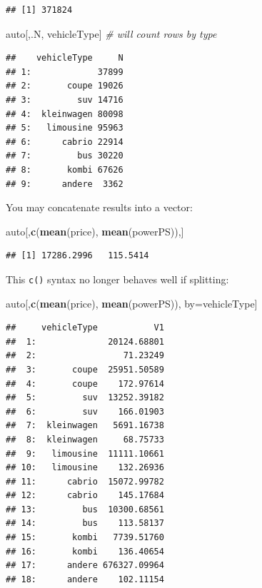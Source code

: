 \documentclass[]{book}
\newenvironment{Shaded}{\begin{snugshade}}{\end{snugshade}}
\newcommand{\CommentTok}[1]{\textcolor[rgb]{0.56,0.35,0.01}{\textit{#1}}}
\newcommand{\KeywordTok}[1]{\textcolor[rgb]{0.13,0.29,0.53}{\textbf{#1}}}
\newcommand{\NormalTok}[1]{#1}
\theoremstyle{definition}
\theoremstyle{definition}
\theoremstyle{definition}
\theoremstyle{remark}
\begin{document}
\begin{verbatim}
## [1] 371824
\end{verbatim}

\begin{Shaded}
\begin{Highlighting}[]
\NormalTok{auto[,.N, vehicleType] }\CommentTok{# will count rows by type}
\end{Highlighting}
\end{Shaded}

\begin{verbatim}
##    vehicleType     N
## 1:             37899
## 2:       coupe 19026
## 3:         suv 14716
## 4:  kleinwagen 80098
## 5:   limousine 95963
## 6:      cabrio 22914
## 7:         bus 30220
## 8:       kombi 67626
## 9:      andere  3362
\end{verbatim}

You may concatenate results into a vector:

\begin{Shaded}
\begin{Highlighting}[]
\NormalTok{auto[,}\KeywordTok{c}\NormalTok{(}\KeywordTok{mean}\NormalTok{(price), }\KeywordTok{mean}\NormalTok{(powerPS)),]}
\end{Highlighting}
\end{Shaded}

\begin{verbatim}
## [1] 17286.2996   115.5414
\end{verbatim}

This \texttt{c()} syntax no longer behaves well if splitting:

\begin{Shaded}
\begin{Highlighting}[]
\NormalTok{auto[,}\KeywordTok{c}\NormalTok{(}\KeywordTok{mean}\NormalTok{(price), }\KeywordTok{mean}\NormalTok{(powerPS)), by=vehicleType]}
\end{Highlighting}
\end{Shaded}

\begin{verbatim}
##     vehicleType           V1
##  1:              20124.68801
##  2:                 71.23249
##  3:       coupe  25951.50589
##  4:       coupe    172.97614
##  5:         suv  13252.39182
##  6:         suv    166.01903
##  7:  kleinwagen   5691.16738
##  8:  kleinwagen     68.75733
##  9:   limousine  11111.10661
## 10:   limousine    132.26936
## 11:      cabrio  15072.99782
## 12:      cabrio    145.17684
## 13:         bus  10300.68561
## 14:         bus    113.58137
## 15:       kombi   7739.51760
## 16:       kombi    136.40654
## 17:      andere 676327.09964
## 18:      andere    102.11154
\end{verbatim}
\end{document}
